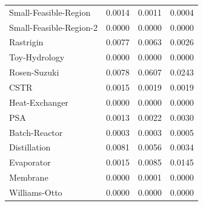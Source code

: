 \documentclass[12pt,a4paper]{article}%
\theoremstyle{plain}%
\theoremstyle{remark}%
\theoremstyle{definition}%
\providecommand{\DIFaddend}{} %
\DeclareRobustCommand{\DIFaddend}{\DIFOaddend \let\includegraphics\DIFOincludegraphics} %
\begin{document}
\begin{appendices}
\begin{table}[htbp]
\begin{tabular}{@{}lrrr@{}}
\midrule
Small-Feasible-Region   & 0.0014 & 0.0011 & 0.0004 \\
Small-Feasible-Region-2 & 0.0000 & 0.0000 & 0.0000 \\
Rastrigin               & 0.0077 & 0.0063 & 0.0026 \\
Toy-Hydrology           & 0.0000 & 0.0000 & 0.0000 \\
Rosen-Suzuki            & 0.0078 & 0.0607 & 0.0243 \\
\midrule
CSTR                    & 0.0015 & 0.0019 & 0.0019 \\
Heat-Exchanger          & 0.0000 & 0.0000 & 0.0000 \\
PSA                     & 0.0013 & 0.0022 & 0.0030 \\
Batch-Reactor           & 0.0003 & 0.0003 & 0.0005 \\
Distillation            & 0.0081 & 0.0056 & 0.0034 \\
Evaporator              & 0.0015 & 0.0085 & 0.0145 \\
Membrane                & 0.0000 & 0.0001 & 0.0000 \\
Williams-Otto           & 0.0000 & 0.0000 & 0.0000 \\
\bottomrule
\end{tabular}
\end{table}

\DIFaddend 


\end{appendices}
\end{document}
